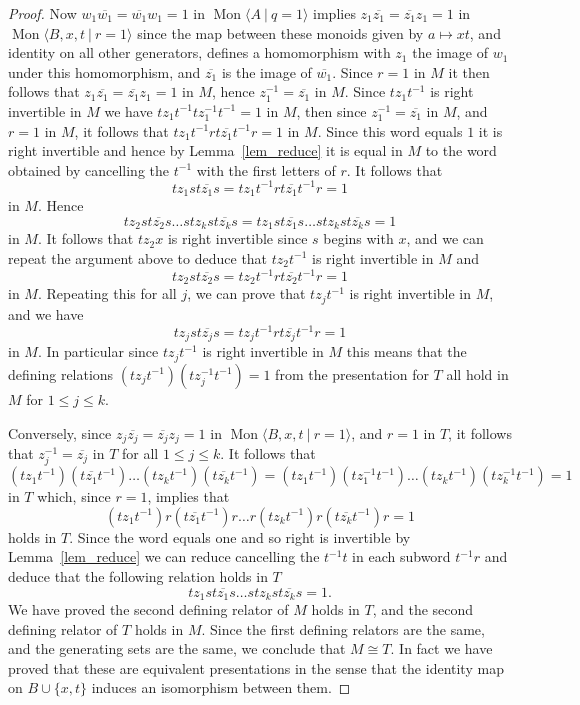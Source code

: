 \documentclass{amsart}
\newcommand{\Mpres}[2]{\operatorname{Mon}\bigl\langle #1\:|\:#2 \bigr\rangle}
\theoremstyle{plain}
\theoremstyle{definition}
\begin{document}
\begin{proof}
Now $w_1 \overline{w_1} = \overline{w_1} w_1 = 1$ in $\Mpres{A}{q=1}$ implies 
$z_1 \overline{z_1} = \overline{z_1} z_1 = 1$ in $\Mpres{B,x,t}{r=1}$ since the map between these monoids given by $a \mapsto xt$, and identity on all other generators, defines a homomorphism with $z_1$ the image of $w_1$ under this homomorphism, and       
$\overline{z_1}$ is the image of $\overline{w_1}$.   
Since $r=1$ in $M$ it then follows that $z_1 \overline{z_1} = \overline{z_1} z_1 = 1$ in $M$, hence $z_1^{-1} = \overline{z_1}$ in $M$.    
Since $t z_1 t^{-1} $ is right invertible in $M$ we have 
$
t z_1 t^{-1} t z_1^{-1} t^{-1} = 1  
$
in $M$, then since  $z_1^{-1} = \overline{z_1}$ in $M$, and $r=1$ in $M$, it follows that 
$
t z_1 t^{-1} r t \overline{z_1} t^{-1} r = 1  
$
in $M$. Since this word equals $1$ it is right invertible and hence by Lemma~\ref{lem_reduce} it is equal in $M$ to the word obtained by cancelling the $t^{-1}$ with the first letters of $r$. It follows that       
\[ 
t z_1 s t\overline{z_1} s = t z_1 t^{-1} r t \overline{z_1} t^{-1} r = 1  
\]
in $M$. Hence  
\[
t z_2 s t\overline{z_2} s  \ldots  s t z_k s t\overline{z_k} s =
t z_1 s t\overline{z_1} s  \ldots  s t z_k s t\overline{z_k} s = 1
\]
in $M$. It follows that $t z_2 x$ is right invertible since $s$ begins with $x$, and we can repeat the argument above to deduce that 
$t z_2 t^{-1} $ is right invertible in $M$ and  
\[
t z_2 s t\overline{z_2} s =
t z_2 t^{-1} r t \overline{z_2} t^{-1} r =
 1  
\]
in $M$. 
Repeating this for all $j$, we can prove that 
$t z_j t^{-1} $ is right invertible  in $M$, and we have  
\[
t z_j s t\overline{z_j} s = 
t z_j t^{-1} r t \overline{z_j} t^{-1} r =
1  
\]
in $M$. 
In particular since
$t z_j t^{-1} $ is right invertible  in $M$ 
this means that the defining relations   
$
(t z_j t^{-1}) (t z_j^{-1} t^{-1}) = 1  
$
from the presentation for $T$ all hold in $M$ for $1 \leq j \leq k$.     

Conversely, 
since $z_j \overline{z_j} = \overline{z_j} z_j = 1$ in $\Mpres{B,x,t}{r=1}$, 
and 
$r=1$ in $T$, it follows that $z_j^{-1} = \overline{z_j}$ in $T$ for all $1 \leq j \leq k$. It follows that 
\[
(t z_1 t^{-1})  (t\overline{z_1} t^{-1})  \ldots   (t z_k t^{-1})  (t\overline{z_k} t^{-1})  = 
(t z_1 t^{-1})  (tz_1^{-1} t^{-1})  \ldots   (t z_k t^{-1})  (tz_k^{-1} t^{-1}) =
1 
\] 
in $T$ which, since $r=1$, implies that   
\[
(t z_1 t^{-1}) r (t\overline{z_1} t^{-1}) r  \ldots  r (t z_k t^{-1}) r (t\overline{z_k} t^{-1}) r = 1 
\]  
holds in $T$.  
Since the word equals one and so right is invertible by Lemma~\ref{lem_reduce} we can reduce cancelling the $t^{-1} t$ in each subword $t^{-1}r$ and deduce that the following relation holds in $T$  
\[
t z_1 s t\overline{z_1} s  \ldots  s t z_k s t\overline{z_k} s = 1. 
\]
We have proved the second defining relator of $M$ holds in $T$, and the second defining relator of $T$ holds in $M$. Since the first defining relators are the same, and the generating sets are the same, we conclude that $M \cong T$. 
In fact we have proved that these are equivalent presentations in the sense that the identity map on $B \cup \{x,t\}$ induces an isomorphism between them.  


\end{proof}
\end{document}
